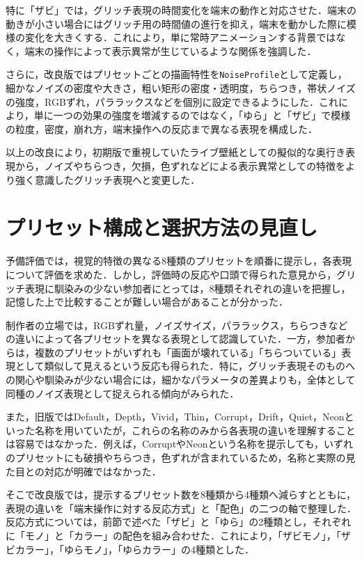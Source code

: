 特に「ザビ」では，グリッチ表現の時間変化を端末の動作と対応させた．端末の動きが小さい場合にはグリッチ用の時間値の進行を抑え，端末を動かした際に模様の変化を大きくする．これにより，単に常時アニメーションする背景ではなく，端末の操作によって表示異常が生じているような関係を強調した．

さらに，改良版ではプリセットごとの描画特性を\texttt{NoiseProfile}として定義し，細かなノイズの密度や大きさ，粗い矩形の密度・透明度，ちらつき，帯状ノイズの強度，RGBずれ，パララックスなどを個別に設定できるようにした．これにより，単に一つの効果の強度を増減するのではなく，「ゆら」と「ザビ」で模様の粒度，密度，崩れ方，端末操作への反応まで異なる表現を構成した．

以上の改良により，初期版で重視していたライブ壁紙としての擬似的な奥行き表現から，ノイズやちらつき，欠損，色ずれなどによる表示異常としての特徴をより強く意識したグリッチ表現へと変更した．


\section{プリセット構成と選択方法の見直し}

予備評価では，視覚的特徴の異なる8種類のプリセットを順番に提示し，各表現について評価を求めた．しかし，評価時の反応や口頭で得られた意見から，グリッチ表現に馴染みの少ない参加者にとっては，8種類それぞれの違いを把握し，記憶した上で比較することが難しい場合があることが分かった．

制作者の立場では，RGBずれ量，ノイズサイズ，パララックス，ちらつきなどの違いによって各プリセットを異なる表現として認識していた．一方，参加者からは，複数のプリセットがいずれも「画面が壊れている」「ちらついている」表現として類似して見えるという反応も得られた．特に，グリッチ表現そのものへの関心や馴染みが少ない場合には，細かなパラメータの差異よりも，全体として同種のノイズ表現として捉えられる傾向がみられた．

また，旧版ではDefault，Depth，Vivid，Thin，Corrupt，Drift，Quiet，Neonといった名称を用いていたが，これらの名称のみから各表現の違いを理解することは容易ではなかった．例えば，CorruptやNeonという名称を提示しても，いずれのプリセットにも破損やちらつき，色ずれが含まれているため，名称と実際の見た目との対応が明確ではなかった．

そこで改良版では，提示するプリセット数を8種類から4種類へ減らすとともに，表現の違いを「端末操作に対する反応方式」と「配色」の二つの軸で整理した．反応方式については，前節で述べた「ザビ」と「ゆら」の2種類とし，それぞれに「モノ」と「カラー」の配色を組み合わせた．これにより，「ザビモノ」，「ザビカラー」，「ゆらモノ」，「ゆらカラー」の4種類とした．


